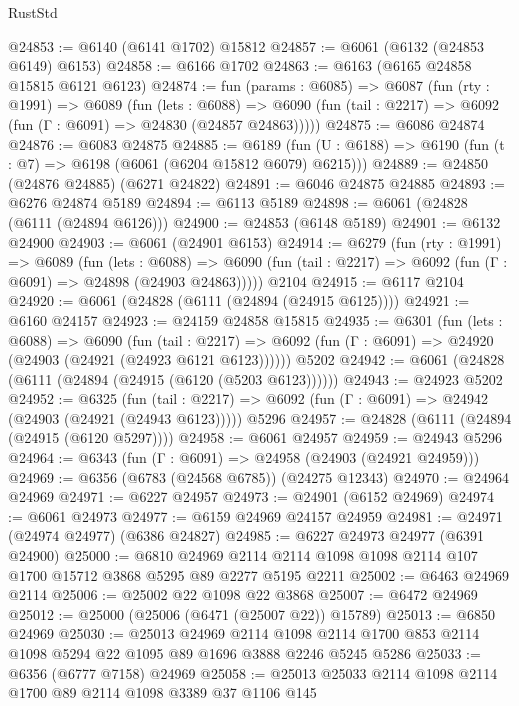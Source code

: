 \begin{lexlean}{RustStd}
\begin{coremodule}
{\begin{coremodule}
{{{{{{{{{{{{{{{{{{{{{{{{{{@24853 := @6140 (@6141 @1702) @15812
@24857 := @6061 (@6132 (@24853 @6149) @6153)
@24858 := @6166 @1702
@24863 := @6163 (@6165 @24858 @15815 @6121 @6123)
@24874 := fun (params : @6085) =>
  @6087
    (fun (rty : @1991) =>
    @6089
      (fun (lets : @6088) =>
      @6090 (fun (tail : @2217) => @6092 (fun (Γ : @6091) => @24830 (@24857 @24863)))))
@24875 := @6086 @24874
@24876 := @6083 @24875
@24885 := @6189
    (fun (U : @6188) => @6190 (fun (t : @7) => @6198 (@6061 (@6204 @15812 @6079) @6215)))
@24889 := @24850 (@24876 @24885) (@6271 @24822)
@24891 := @6046 @24875 @24885
@24893 := @6276 @24874 @5189
@24894 := @6113 @5189
@24898 := @6061 (@24828 (@6111 (@24894 @6126)))
@24900 := @24853 (@6148 @5189)
@24901 := @6132 @24900
@24903 := @6061 (@24901 @6153)
@24914 := @6279
    (fun (rty : @1991) =>
    @6089
      (fun (lets : @6088) =>
      @6090 (fun (tail : @2217) => @6092 (fun (Γ : @6091) => @24898 (@24903 @24863)))))
    @2104
@24915 := @6117 @2104
@24920 := @6061 (@24828 (@6111 (@24894 (@24915 @6125))))
@24921 := @6160 @24157
@24923 := @24159 @24858 @15815
@24935 := @6301
    (fun (lets : @6088) =>
    @6090
      (fun (tail : @2217) =>
      @6092 (fun (Γ : @6091) => @24920 (@24903 (@24921 (@24923 @6121 @6123))))))
    @5202
@24942 := @6061 (@24828 (@6111 (@24894 (@24915 (@6120 (@5203 @6123))))))
@24943 := @24923 @5202
@24952 := @6325
    (fun (tail : @2217) => @6092 (fun (Γ : @6091) => @24942 (@24903 (@24921 (@24943 @6123)))))
    @5296
@24957 := @24828 (@6111 (@24894 (@24915 (@6120 @5297))))
@24958 := @6061 @24957
@24959 := @24943 @5296
@24964 := @6343 (fun (Γ : @6091) => @24958 (@24903 (@24921 @24959)))
@24969 := @6356 (@6783 (@24568 @6785)) (@24275 @12343)
@24970 := @24964 @24969
@24971 := @6227 @24957
@24973 := @24901 (@6152 @24969)
@24974 := @6061 @24973
@24977 := @6159 @24969 @24157 @24959
@24981 := @24971 (@24974 @24977) (@6386 @24827)
@24985 := @6227 @24973 @24977 (@6391 @24900)
@25000 := @6810
    @24969
    @2114
    @2114
    @1098
    @1098
    @2114
    @107
    @1700
    @15712
    @3868
    @5295
    @89
    @2277
    @5195
    @2211
@25002 := @6463 @24969 @2114
@25006 := @25002 @22 @1098 @22 @3868
@25007 := @6472 @24969
@25012 := @25000 (@25006 (@6471 (@25007 @22)) @15789)
@25013 := @6850 @24969
@25030 := @25013
    @24969
    @2114
    @1098
    @2114
    @1700
    @853
    @2114
    @1098
    @5294
    @22
    @1095
    @89
    @1696
    @3888
    @2246
    @5245
    @5286
@25033 := @6356 (@6777 @7158) @24969
@25058 := @25013
    @25033
    @2114
    @1098
    @2114
    @1700
    @89
    @2114
    @1098
    @3389
    @37
    @1106
    @145
}}}}}}}}}}}}}}}}}}}}}}}}}}
\end{coremodule}}
\end{coremodule}
\end{lexlean}
